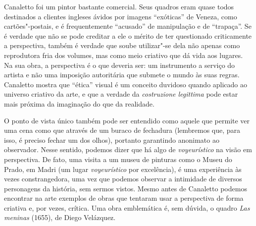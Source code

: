 Canaletto foi um pintor bastante comercial. Seus quadros eram quase
todos destinados a clientes ingleses ávidos por imagens ``exóticas'' de
Veneza, como cartões"-postais, e é frequentemente ``acusado'' de
manipulação e de ``trapaça''. Se é verdade que não se pode creditar a
ele o mérito de ter questionado criticamente a perspectiva, também é
verdade que soube utilizar"-se dela não apenas como reprodutora fria dos
volumes, mas como meio criativo que dá vida aos lugares. Na sua obra, a
perspectiva é o que deveria ser: um instrumento a serviço do artista e
não uma imposição autoritária que submete o mundo às suas regras.
Canaletto mostra que ``ética'' visual é um conceito duvidoso quando
aplicado ao universo criativo da arte, e que a verdade da
\emph{costruzione legittima} pode estar mais próxima da imaginação do
que da realidade.

O ponto de vista único também pode ser entendido como aquele
que permite ver uma cena como que através de um buraco de fechadura
(lembremos que, para isso, é preciso fechar um dos olhos), portanto
garantindo anonimato ao observador. Nesse sentido, podemos dizer que há
algo de \emph{voyeurístico} na visão em perspectiva. De fato, uma visita
a um museu de pinturas como o Museu do Prado, em Madri (um lugar
\emph{voyeurístico} por excelência), é uma experiência às vezes
constrangedora, uma vez que podemos observar a intimidade de diversos
personagens da história, sem sermos vistos.
Mesmo antes de Canaletto podemos encontrar na arte exemplos de obras que
tentaram usar a perspectiva de forma criativa e, por vezes, crítica. Uma
obra emblemática é, sem dúvida, o quadro \emph{Las meninas} (1655), de
Diego Velázquez. 

